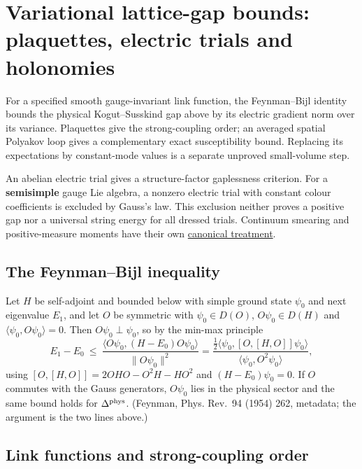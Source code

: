 \documentclass[11pt,a4paper]{article}
\begin{document}
\hypertarget{variational-lattice-gap-bounds-plaquettes-electric-trials-and-holonomies}{%
\section{Variational lattice-gap bounds: plaquettes, electric trials and
holonomies}\label{variational-lattice-gap-bounds-plaquettes-electric-trials-and-holonomies}}

For a specified smooth gauge-invariant link function, the Feynman--Bijl
identity bounds the physical Kogut--Susskind gap above by its electric
gradient norm over its variance. Plaquettes give the strong-coupling
order; an averaged spatial Polyakov loop gives a complementary exact
susceptibility bound. Replacing its expectations by constant-mode values
is a separate unproved small-volume step.

An abelian electric trial gives a structure-factor gaplessness
criterion. For a \textbf{semisimple} gauge Lie algebra, a nonzero
electric trial with constant colour coefficients is excluded by Gauss's
law. This exclusion neither proves a positive gap nor a universal string
energy for all dressed trials. Continuum smearing and positive-measure
moments have their own
\href{finiteness-half-flowed-susceptibility.md}{canonical treatment}.

\hypertarget{the-feynmanbijl-inequality}{%
\subsection{The Feynman--Bijl
inequality}\label{the-feynmanbijl-inequality}}

Let \(H\) be self-adjoint and bounded below with simple ground state
\(\psi_0\) and next eigenvalue \(E_1\), and let \(O\) be symmetric with
\(\psi_0\in D(O)\), \(O\psi_0\in D(H)\) and
\(\langle\psi_0,O\psi_0\rangle=0\). Then \(O\psi_0\perp\psi_0\), so by
the min-max principle
\[E_1-E_0\ \le\ \frac{\langle O\psi_0,(H-E_0)O\psi_0\rangle}{\|O\psi_0\|^2}
=\frac{\tfrac12\langle\psi_0,[O,[H,O]]\psi_0\rangle}{\langle\psi_0,O^2\psi_0\rangle},\]
using \([O,[H,O]]=2OHO-O^2H-HO^2\) and \((H-E_0)\psi_0=0\). If \(O\)
commutes with the Gauss generators, \(O\psi_0\) lies in the physical
sector and the same bound holds for \(\Delta^{\rm phys}\). (Feynman,
Phys. Rev.~94 (1954) 262, metadata; the argument is the two lines
above.)

\hypertarget{link-functions-and-strong-coupling-order}{%
\subsection{Link functions and strong-coupling
order}\label{link-functions-and-strong-coupling-order}}
\end{document}
